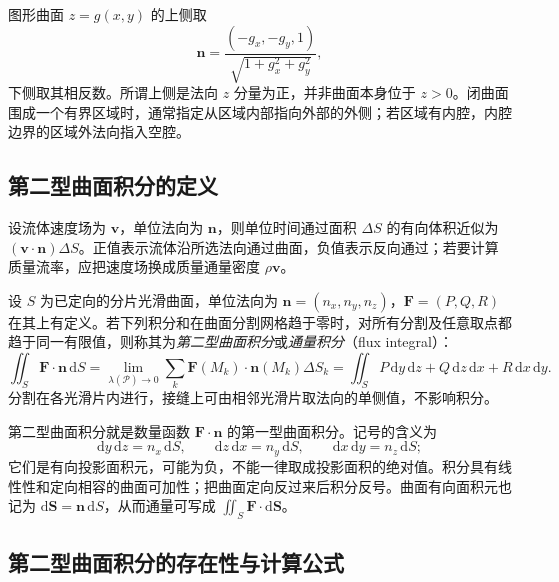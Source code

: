 \documentclass[UTF8,12pt,a4paper,fontset=fandol]{ctexbook}
\begin{document}
图形曲面 $z=g(x,y)$ 的上侧取
\[
    \boldsymbol n=\frac{(-g_x,-g_y,1)}{\sqrt{1+g_x^2+g_y^2}},
\]
下侧取其相反数。所谓上侧是法向 $z$ 分量为正，并非曲面本身位于 $z>0$。闭曲面围成一个有界区域时，通常指定从区域内部指向外部的外侧；若区域有内腔，内腔边界的区域外法向指入空腔。

\subsection{第二型曲面积分的定义}
\label{subsec:definition-of-surface-integrals-of-the-second-kind}

设流体速度场为 $\boldsymbol v$，单位法向为 $\boldsymbol n$，则单位时间通过面积 $\Delta S$ 的有向体积近似为 $(\boldsymbol v\cdot\boldsymbol n)\Delta S$。正值表示流体沿所选法向通过曲面，负值表示反向通过；若要计算质量流率，应把速度场换成质量通量密度 $\rho\boldsymbol v$。

\begin{definition}
\label{def:surface-integral-second-kind}
设 $S$ 为已定向的分片光滑曲面，单位法向为 $\boldsymbol n=(n_x,n_y,n_z)$，$\boldsymbol F=(P,Q,R)$ 在其上有定义。若下列积分和在曲面分割网格趋于零时，对所有分割及任意取点都趋于同一有限值，则称其为\emph{第二型曲面积分}或\emph{通量积分}（flux integral）：
\begin{equation}
\label{eq:second-surface-integral-definition}
    \iint_S\boldsymbol F\cdot\boldsymbol n\,\mathrm dS
    =\lim_{\lambda(\mathcal P)\to0}
      \sum_k\boldsymbol F(M_k)\cdot\boldsymbol n(M_k)\Delta S_k
    =\iint_S P\,\mathrm dy\,\mathrm dz+Q\,\mathrm dz\,\mathrm dx+R\,\mathrm dx\,\mathrm dy.
\end{equation}
分割在各光滑片内进行，接缝上可由相邻光滑片取法向的单侧值，不影响积分。
\end{definition}

第二型曲面积分就是数量函数 $\boldsymbol F\cdot\boldsymbol n$ 的第一型曲面积分。记号的含义为
\begin{equation}
\label{eq:oriented-surface-elements}
    \mathrm dy\,\mathrm dz=n_x\,\mathrm dS,\qquad
    \mathrm dz\,\mathrm dx=n_y\,\mathrm dS,\qquad
    \mathrm dx\,\mathrm dy=n_z\,\mathrm dS;
\end{equation}
它们是有向投影面积元，可能为负，不能一律取成投影面积的绝对值。积分具有线性性和定向相容的曲面可加性；把曲面定向反过来后积分反号。曲面有向面积元也记为 $\mathrm d\boldsymbol S=\boldsymbol n\,\mathrm dS$，从而通量可写成 $\iint_S\boldsymbol F\cdot\mathrm d\boldsymbol S$。

\subsection{第二型曲面积分的存在性与计算公式}
\label{subsec:existence-and-evaluation-of-surface-integrals-of-the-second-kind}
\end{document}
